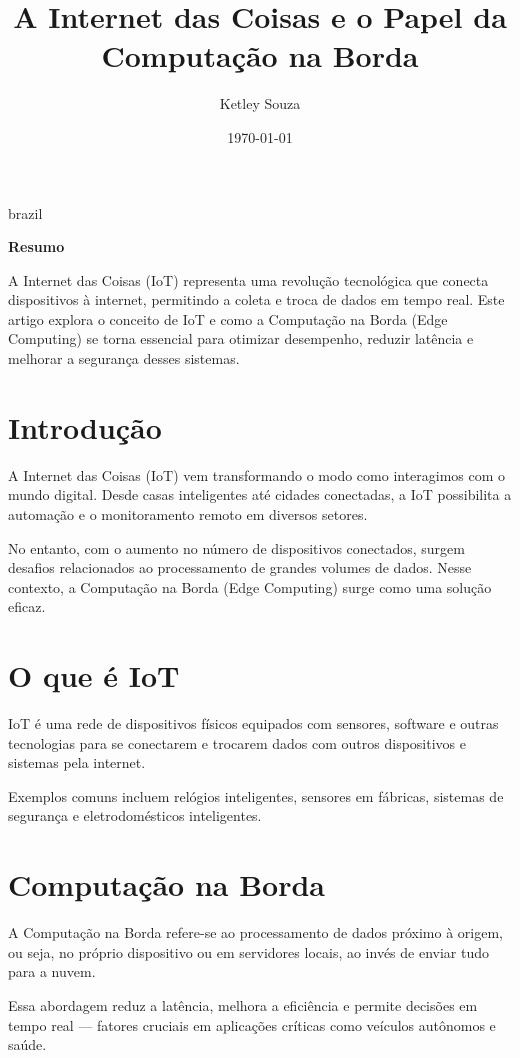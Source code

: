 \documentclass[12pt]{article}
\title{A Internet das Coisas e o Papel da Computação na Borda}
\author{Ketley Souza}
\date{\today}
\begin{document}
\maketitle

\begin{otherlanguage*}{brazil}
\begin{center}
\textbf{Resumo}
\end{center}
A Internet das Coisas (IoT) representa uma revolução tecnológica que conecta dispositivos à internet, permitindo a coleta e troca de dados em tempo real. Este artigo explora o conceito de IoT e como a Computação na Borda (Edge Computing) se torna essencial para otimizar desempenho, reduzir latência e melhorar a segurança desses sistemas.
\end{otherlanguage*}

\section{Introdução}
A Internet das Coisas (IoT) vem transformando o modo como interagimos com o mundo digital. Desde casas inteligentes até cidades conectadas, a IoT possibilita a automação e o monitoramento remoto em diversos setores.

No entanto, com o aumento no número de dispositivos conectados, surgem desafios relacionados ao processamento de grandes volumes de dados. Nesse contexto, a Computação na Borda (Edge Computing) surge como uma solução eficaz.

\section{O que é IoT}
IoT é uma rede de dispositivos físicos equipados com sensores, software e outras tecnologias para se conectarem e trocarem dados com outros dispositivos e sistemas pela internet.

Exemplos comuns incluem relógios inteligentes, sensores em fábricas, sistemas de segurança e eletrodomésticos inteligentes.

\section{Computação na Borda}
A Computação na Borda refere-se ao processamento de dados próximo à origem, ou seja, no próprio dispositivo ou em servidores locais, ao invés de enviar tudo para a nuvem.

Essa abordagem reduz a latência, melhora a eficiência e permite decisões em tempo real — fatores cruciais em aplicações críticas como veículos autônomos e saúde.
\end{document}
